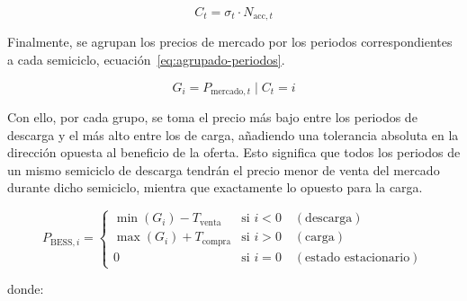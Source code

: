 \begin{equation}
\label{eq:conteo-ciclos-signo}
C_{t} = \sigma_{t} \cdot N_{\text{acc}, t}
\end{equation}

Finalmente, se agrupan los precios de mercado por los periodos correspondientes a cada semiciclo, ecuación~\ref{eq:agrupado-periodos}.

\begin{equation}
\label{eq:agrupado-periodos}
G_{i} = { P_{\text{mercado}, t} \mid C_{t} = i }
\end{equation}

Con ello, por cada grupo, se toma el precio más bajo entre los periodos de descarga y el más alto entre los de carga, añadiendo una tolerancia absoluta en la dirección opuesta al beneficio de la oferta. Esto significa que todos los periodos de un mismo semiciclo de descarga tendrán el precio menor de venta del mercado durante dicho semiciclo, mientra que exactamente lo opuesto para la carga.

\begin{equation}
P_{\text{BESS}, i} = \begin{cases}
\min(G_{i}) - T_{\text{venta}}  & \text{si } i < 0 \quad (\text{descarga}) \\
\max(G_{i}) + T_{\text{compra}} & \text{si } i > 0 \quad (\text{carga}) \\
0                               & \text{si } i = 0 \quad (\text{estado estacionario})
\end{cases}
\end{equation}

donde:

